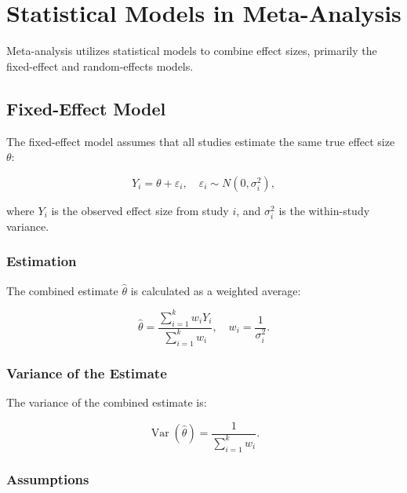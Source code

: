 \documentclass[12pt,a4paper]{report}
\newcommand{\Var}{\operatorname{Var}}
\begin{document}
\section{Statistical Models in Meta-Analysis}
\label{sec:statistical_models}

Meta-analysis utilizes statistical models to combine effect sizes, primarily the fixed-effect and random-effects models.

\subsection{Fixed-Effect Model}
\label{subsec:fixed_effect_model}

The fixed-effect model assumes that all studies estimate the same true effect size $\theta$:

\begin{equation}
\label{eq:fixed_effect_model}
Y_i = \theta + \varepsilon_i, \quad \varepsilon_i \sim N(0, \sigma_i^2),
\end{equation}

where $Y_i$ is the observed effect size from study $i$, and $\sigma_i^2$ is the within-study variance.

\subsubsection{Estimation}
\label{subsubsec:fixed_estimation}

The combined estimate $\hat{\theta}$ is calculated as a weighted average:

\begin{equation}
\label{eq:fixed_effect_estimate}
\hat{\theta} = \frac{\sum_{i=1}^k w_i Y_i}{\sum_{i=1}^k w_i}, \quad w_i = \frac{1}{\sigma_i^2}.
\end{equation}

\subsubsection{Variance of the Estimate}
\label{subsubsec:fixed_variance}

The variance of the combined estimate is:

\begin{equation}
\label{eq:fixed_effect_variance}
\Var(\hat{\theta}) = \frac{1}{\sum_{i=1}^k w_i}.
\end{equation}

\subsubsection{Assumptions}
\label{subsubsec:fixed_assumptions}
\end{document}
